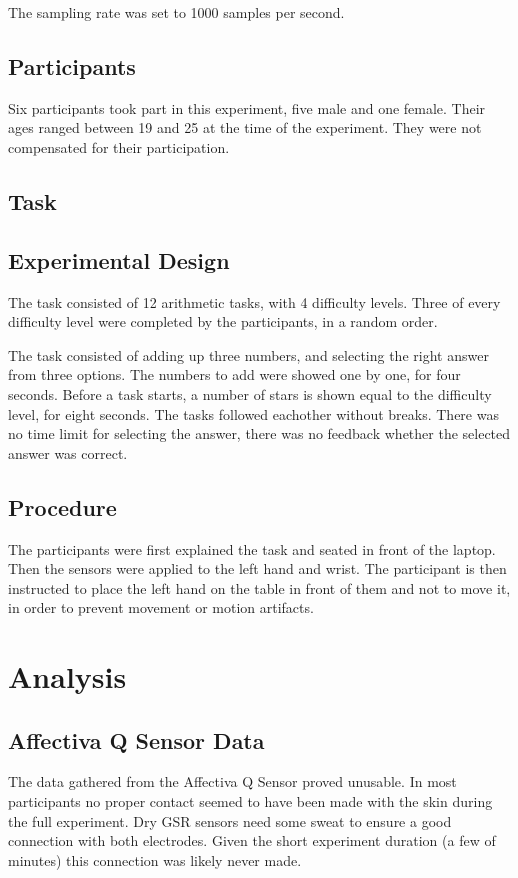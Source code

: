 \documentclass[11pt,leqno,letterpaper]{report} %
\begin{document}
The sampling rate was set to 1000 samples per second.

\subsection{Participants}
Six participants took part in this experiment, five male and one female. Their ages ranged between 19 and 25 at the time of the experiment. They were not compensated for their participation.




\subsection{Task}

\subsection{Experimental Design}
The task consisted of 12 arithmetic tasks, with 4 difficulty levels. Three of every difficulty level were completed by the participants, in a random order. 

The task consisted of adding up three numbers, and selecting the right answer from three options. The numbers to add were showed one by one, for four seconds. Before a task starts, a number of stars is shown equal to the difficulty level, for eight seconds. The tasks followed eachother without breaks. There was no time limit for selecting the answer, there was no feedback whether the selected answer was correct.


\subsection{Procedure}
The participants were first explained the task and seated in front of the laptop. Then the sensors were applied to the left hand and wrist. The participant is then instructed to place the left hand on the table in front of them and not to move it, in order to prevent movement or motion artifacts.

\section{Analysis}

\subsection{Affectiva Q Sensor Data}
The data gathered from the Affectiva Q Sensor proved unusable. In most participants no proper contact seemed to have been made with the skin during the full experiment. Dry GSR sensors need some sweat to ensure a good connection with both electrodes. Given the short experiment duration (a few of minutes) this connection was likely never made.
\end{document}
